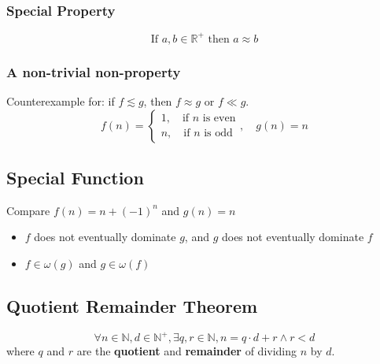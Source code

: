 \documentclass{article}
\begin{document}
\subsubsection{Special Property}
\[
\text{If }a,b\in\mathbb{R}^+\text{ then }a\approx b
\]

\subsubsection{A non-trivial non-property}
Counterexample for: if $f\lesssim g$, then $f\approx g$ or $f\ll g$.
\[
f(n)=
\begin{cases}
    1,\quad\text{if $n$ is even}\\
    n,\quad\text{if $n$ is odd}
\end{cases}, \quad g(n)=n
\]

\subsection{Special Function}
Compare $f(n)=n+(-1)^n$ and $g(n)=n$
\begin{itemize}
    \item $f$ does not eventually dominate $g$, and $g$ does not eventually dominate $f$
    \item $f\in\omega(g)$ and $g\in\omega(f)$
\end{itemize}

\subsection{Quotient Remainder Theorem}
\[
\forall n\in\mathbb{N},d\in\mathbb{N}^+,\exists q, r\in\mathbb{N}, n=q\cdot d+r\wedge r<d
\]
where $q$ and $r$ are the \textbf{quotient} and \textbf{remainder} of dividing $n$ by $d$.
\end{document}
